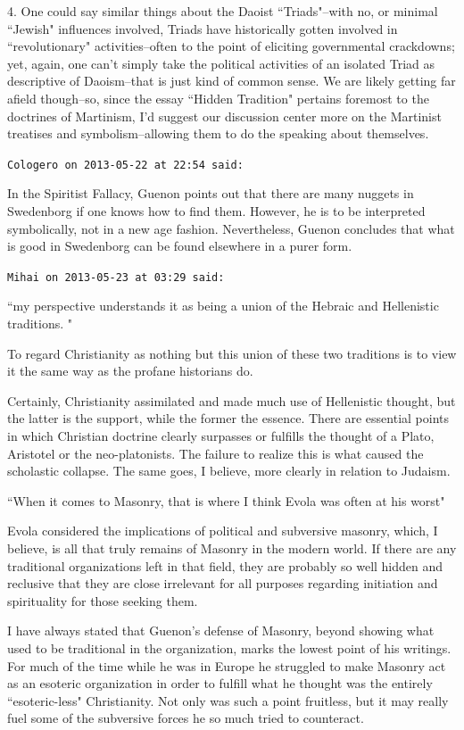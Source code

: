 \begin{footnotesize}
\begin{sffamily}
4. One could say similar things about the Daoist ``Triads"–with no, or minimal ``Jewish" influences involved, Triads have historically gotten involved in ``revolutionary" activities–often to the point of eliciting governmental crackdowns; yet, again, one can't simply take the political activities of an isolated Triad as descriptive of Daoism–that is just kind of common sense. We are likely getting far afield though–so, since the essay ``Hidden Tradition" pertains foremost to the doctrines of Martinism, I'd suggest our discussion center more on the Martinist treatises and symbolism–allowing them to do the speaking about themselves.


\hfill

\texttt{Cologero on 2013-05-22 at 22:54 said: }

In the Spiritist Fallacy, Guenon points out that there are many nuggets in Swedenborg if one knows how to find them. However, he is to be interpreted symbolically, not in a new age fashion. Nevertheless, Guenon concludes that what is good in Swedenborg can be found elsewhere in a purer form.


\hfill

\texttt{Mihai on 2013-05-23 at 03:29 said: }

``my perspective understands it as being a union of the Hebraic and Hellenistic traditions. "

To regard Christianity as nothing but this union of these two traditions is to view it the same way as the profane historians do.

Certainly, Christianity assimilated and made much use of Hellenistic thought, but the latter is the support, while the former the essence. There are essential points in which Christian doctrine clearly surpasses or fulfills the thought of a Plato, Aristotel or the neo-platonists. The failure to realize this is what caused the scholastic collapse. The same goes, I believe, more clearly in relation to Judaism.

``When it comes to Masonry, that is where I think Evola was often at his worst"

Evola considered the implications of political and subversive masonry, which, I believe, is all that truly remains of Masonry in the modern world. If there are any traditional organizations left in that field, they are probably so well hidden and reclusive that they are close irrelevant for all purposes regarding initiation and spirituality for those seeking them.

I have always stated that Guenon's defense of Masonry, beyond showing what used to be traditional in the organization, marks the lowest point of his writings. For much of the time while he was in Europe he struggled to make Masonry act as an esoteric organization in order to fulfill what he thought was the entirely ``esoteric-less" Christianity. Not only was such a point fruitless, but it may really fuel some of the subversive forces he so much tried to counteract. 


\end{sffamily}
\end{footnotesize}
